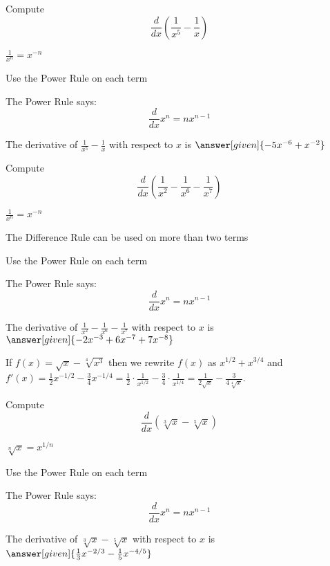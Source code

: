 \documentclass{ximera}
\begin{document}
\begin{problem} %
  Compute 
  \[
  \frac{d}{dx} \left(\frac{1}{x^5} - \frac{1}{x}\right)
  \]
  
    \begin{hint}
		 $\frac{1}{x^n} = x^{-n}$
		\end{hint}
		\begin{hint}
      Use the Power Rule on each term
    \end{hint}
    \begin{hint}
      The Power Rule says:
      \[
      \frac{d}{dx} x^n = nx^{n-1}
      \]
    \end{hint}    
		The derivative of $\frac{1}{x^5} - \frac{1}{x}$ with respect to $x$ is
		 $\answer[given]{-5x^{-6} + x^{-2}}$
	
\end{problem}


\begin{problem} %
  Compute 
  \[
  \frac{d}{dx} \left(\frac{1}{x^2} - \frac{1}{x^6} - \frac{1}{x^7}\right)
  \]
  
    \begin{hint}
		 $\frac{1}{x^n} = x^{-n}$
		\end{hint}
		\begin{hint}
		  The Difference Rule can be used on more than two terms
		\end{hint}
		\begin{hint}
      Use the Power Rule on each term
    \end{hint}
    \begin{hint}
      The Power Rule says:
      \[
      \frac{d}{dx} x^n = nx^{n-1}
      \]
    \end{hint}    
		The derivative of $\frac{1}{x^2} - \frac{1}{x^6} - \frac{1}{x^7}$ with respect to $x$ is
		 $\answer[given]{-2x^{-3} + 6x^{-7} + 7x^{-8}}$
	
\end{problem}


\begin{example} %
 If $f(x) = \sqrt x - \sqrt[4] {x^3}$ then we rewrite $f(x)$ as $x^{1/2} + x^{3/4}$ and
$f'(x) = \tfrac12 x^{-1/2} - \tfrac34 x^{-1/4} = \tfrac12 \cdot \frac{1}{x^{1/2}} - \tfrac34 \cdot \frac{1}{x^{1/4}} 
= \frac{1}{2\sqrt x} - \frac{3}{4\sqrt[4] x}$.
\end{example}


\begin{problem} %
  Compute 
  \[
  \frac{d}{dx} \left(\sqrt[3] x - \sqrt[5] x\right)
  \]
  
    \begin{hint}
		 $\sqrt[n] x = x^{1/n}$
		\end{hint}
		\begin{hint}
      Use the Power Rule on each term
    \end{hint}
    \begin{hint}
      The Power Rule says:
      \[
      \frac{d}{dx} x^n = nx^{n-1}
      \]
    \end{hint}    
		The derivative of $\sqrt[3] x - \sqrt[5] x$ with respect to $x$ is
		 $\answer[given]{\frac13 x^{-2/3} - \frac15 x^{-4/5}}$
	
\end{problem}
\end{document}

